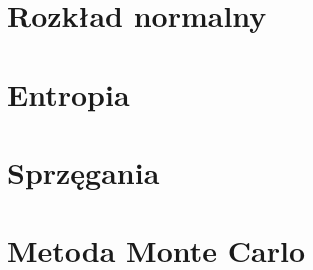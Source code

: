 \documentclass[12pt, a4paper, polish, openany]{book}
\begin{document}
\chapter{Rozkład normalny}


\chapter{Entropia}


\chapter{Sprzęgania}


\chapter{Metoda Monte Carlo}

\end{document}

